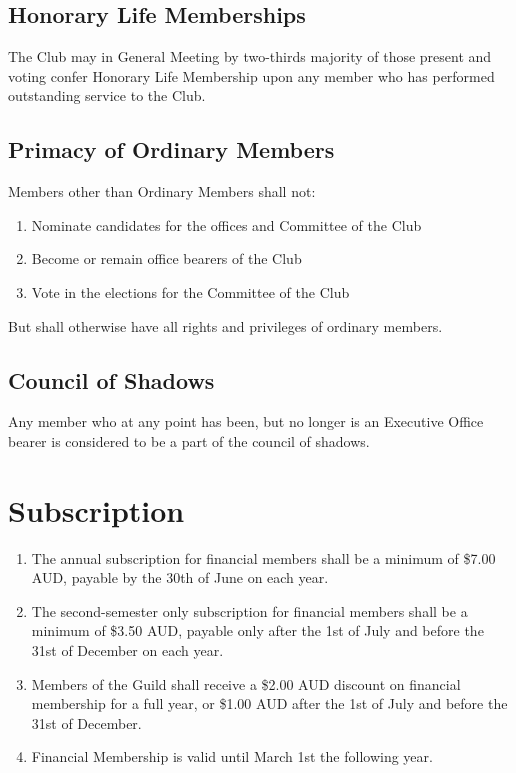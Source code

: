 \documentclass[10pt,a4paper]{report}
\begin{document}
		\subsection{Honorary Life Memberships}
			The Club may in General Meeting by two-thirds majority of those present and voting confer Honorary Life Membership upon any member who has performed outstanding service to the Club.
			
		\subsection{Primacy of Ordinary Members}
		Members other than Ordinary Members shall not:
		\begin{enumerate}[label=\alph*]
			\item Nominate candidates for the offices and Committee of the Club
			\item Become or remain office bearers of the Club
			\item Vote in the elections for the Committee of the Club
		\end{enumerate}
		But shall otherwise have all rights and privileges of ordinary members.
		\subsection{Council of Shadows}
		Any member who at any point has been, but no longer is an Executive Office bearer is considered to be a part of the council of shadows.
	\section{Subscription}
	
		\begin{enumerate}[label=\alph*]
			\item The annual subscription for financial members shall be a minimum of \$7.00 AUD, payable by the 30th of June on each year.
			
			\item The second-semester only subscription for financial members shall be a minimum of \$3.50 AUD, payable only after the 1st of July and before the 31st of December on each year.
			
			\item Members of the Guild shall receive a \$2.00 AUD discount on financial membership for a full year, or \$1.00 AUD after the 1st of July and before the 31st of December.
			
			\item Financial Membership is valid until March 1st the following year.
		\end{enumerate}
	
\end{document}
